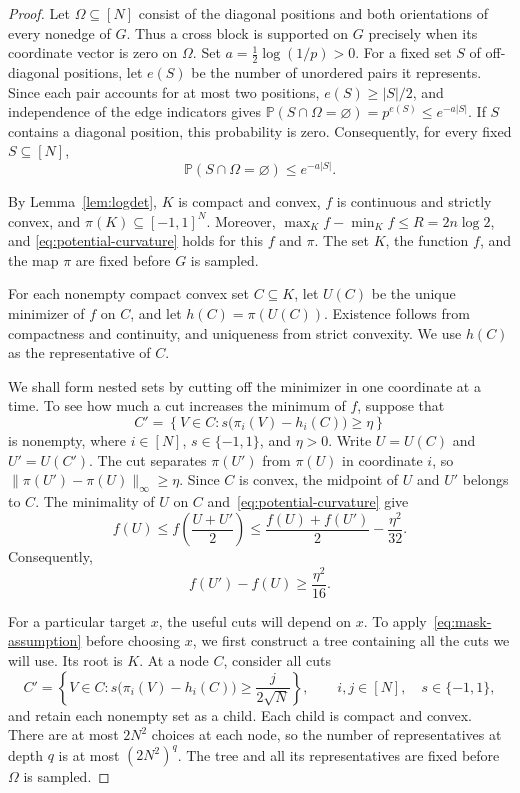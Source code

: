 \documentclass[11pt]{article}
\numberwithin{equation}{section}
\theoremstyle{definition}
\theoremstyle{remark}
\begin{document}
\begin{proof}
Let $\Omega\subseteq[N]$ consist of the diagonal positions and both
orientations of every nonedge of $G$. Thus a cross block is supported
on $G$ precisely when its coordinate vector is zero on $\Omega$.
Set $a=\tfrac12\log(1/p)>0$. For a fixed set $S$ of off-diagonal
positions, let $e(S)$ be the number of unordered pairs it represents.
Since each pair accounts for at most two positions, $e(S)\geq|S|/2$,
and independence of the edge indicators gives
$\mathbb P(S\cap\Omega=\varnothing)=p^{e(S)}\leq e^{-a|S|}$.
If $S$ contains a diagonal position, this probability is zero.
Consequently, for every fixed $S\subseteq[N]$,
\begin{equation}\label{eq:mask-assumption}
 \mathbb P(S\cap\Omega=\varnothing)\leq e^{-a|S|}.
\end{equation}

By Lemma~\ref{lem:logdet}, $K$ is compact and convex, $f$ is continuous
and strictly convex, and $\pi(K)\subseteq[-1,1]^N$.
Moreover, $\max_K f-\min_K f\leq R=2n\log2$, and
\eqref{eq:potential-curvature} holds for this $f$ and $\pi$.
The set $K$, the function $f$, and the map $\pi$ are fixed before
$G$ is sampled.

For each nonempty compact convex set $C\subseteq K$, let $U(C)$
be the unique minimizer of $f$ on $C$, and let
$h(C)=\pi(U(C))$.
Existence follows from compactness and continuity, and uniqueness
from strict convexity. We use $h(C)$ as the representative of $C$.

We shall form nested sets by cutting off the minimizer in one
coordinate at a time. To see how much a cut increases the minimum
of $f$, suppose that
\[
 C'=
 \left\{
 V\in C:
 s\bigl(\pi_i(V)-h_i(C)\bigr)\geq\eta
 \right\}
\]
is nonempty, where $i\in[N]$, $s\in\{-1,1\}$, and $\eta>0$.
Write $U=U(C)$ and $U'=U(C')$. The cut separates $\pi(U')$ from
$\pi(U)$ in coordinate $i$, so $\|\pi(U')-\pi(U)\|_\infty\geq\eta$.
Since $C$ is convex, the midpoint of $U$ and $U'$ belongs to $C$.
The minimality of $U$ on $C$ and~\eqref{eq:potential-curvature} give
\[
 f(U)
 \leq f\!\left(\frac{U+U'}2\right)
 \leq \frac{f(U)+f(U')}{2}-\frac{\eta^2}{32}.
\]
Consequently,
\[
 f(U')-f(U)\geq\frac{\eta^2}{16}.
\]

For a particular target $x$, the useful cuts will depend on $x$.
To apply~\eqref{eq:mask-assumption} before choosing $x$, we first
construct a tree containing all the cuts we will use. Its root is $K$.
At a node $C$, consider all cuts
\[
 C'=
 \left\{
 V\in C:
 s\bigl(\pi_i(V)-h_i(C)\bigr)
 \geq\frac{j}{2\sqrt N}
 \right\},
 \qquad i,j\in[N],\quad s\in\{-1,1\},
\]
and retain each nonempty set as a child. Each child is compact and
convex. There are at most $2N^2$ choices at each node, so the number of representatives
at depth $q$ is at most $(2N^2)^q$. The tree and all its
representatives are fixed before $\Omega$ is sampled.


\end{proof}
\end{document}
